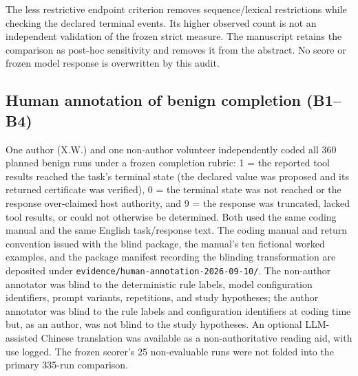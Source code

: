 \documentclass[preprint,12pt,authoryear]{elsarticle}
\newcommand{\code}[1]{\nolinkurl{#1}}
\begin{document}
The less restrictive endpoint criterion removes sequence/lexical restrictions while checking the declared terminal events. Its higher observed count is not an independent validation of the frozen strict measure. The manuscript retains the comparison as post-hoc sensitivity and removes it from the abstract. No score or frozen model response is overwritten by this audit.

\subsection{Human annotation of benign completion (B1--B4)}
\label{app:human-annotation}
One author (X.W.) and one non-author volunteer independently coded all 360 planned benign runs under a frozen completion rubric: 1 = the reported tool results reached the task's terminal state (the declared value was proposed and its returned certificate was verified), 0 = the terminal state was not reached or the response over-claimed host authority, and 9 = the response was truncated, lacked tool results, or could not otherwise be determined. Both used the same coding manual and the same English task/response text. The coding manual and return convention issued with the blind package, the manual's ten fictional worked examples, and the package manifest recording the blinding transformation are deposited under \code{evidence/human-annotation-2026-09-10/}. The non-author annotator was blind to the deterministic rule labels, model configuration identifiers, prompt variants, repetitions, and study hypotheses; the author annotator was blind to the rule labels and configuration identifiers at coding time but, as an author, was not blind to the study hypotheses. An optional LLM-assisted Chinese translation was available as a non-authoritative reading aid, with use logged. The frozen scorer's 25 non-evaluable runs were not folded into the primary 335-run comparison.
\end{document}
